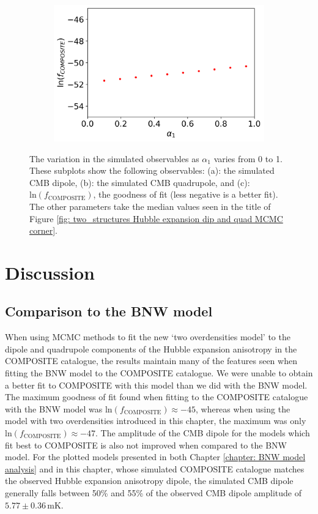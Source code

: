 \documentclass[a4paper,12pt]{report}
\begin{document}
\begin{figure}[tb]
\begin{subfigure}[b]{0.45\textwidth}
        \includegraphics[width=\textwidth]{two structures/COMP only MCMC/0.5 quantile/varying alpha_1/Comp lp varying alpha_1.png}
        \caption{}
    \end{subfigure}
    \caption{The variation in the simulated observables as $\alpha_1$ varies from 0 to 1. These subplots show the following observables: (a): the simulated CMB dipole, (b): the simulated CMB quadrupole, and (c): $\text{ln}(f_\text{COMPOSITE})$, the goodness of fit (less negative is a better fit). The other parameters take the median values seen in the title of Figure \ref{fig: two_structures Hubble expansion dip and quad MCMC corner}.}
    \label{fig: two_structures varying alpha_1 on 0.5 quantile fit}
\end{figure}

\section{Discussion}

\subsection{Comparison to the BNW model}
When using MCMC methods to fit the new `two overdensities model' to the dipole and quadrupole components of the Hubble expansion anisotropy in the COMPOSITE catalogue, the results maintain many of the features seen when fitting the BNW model to the COMPOSITE catalogue. We were unable to obtain a better fit to COMPOSITE with this model than we did with the BNW model. The maximum goodness of fit found when fitting to the COMPOSITE catalogue with the BNW model was $\text{ln}(f_\text{COMPOSITE}) \approx -45$, whereas when using the model with two overdensities introduced in this chapter, the maximum was only $\text{ln}(f_\text{COMPOSITE}) \approx -47$. The amplitude of the CMB dipole for the models which fit best to COMPOSITE is also not improved when compared to the BNW model. For the plotted models presented in both Chapter \ref{chapter: BNW model analysis} and in this chapter, whose simulated COMPOSITE catalogue matches the observed Hubble expansion anisotropy dipole, the simulated CMB dipole generally falls between 50\% and 55\% of the observed CMB dipole amplitude of $5.77 \pm 0.36\,$mK.
\end{document}
